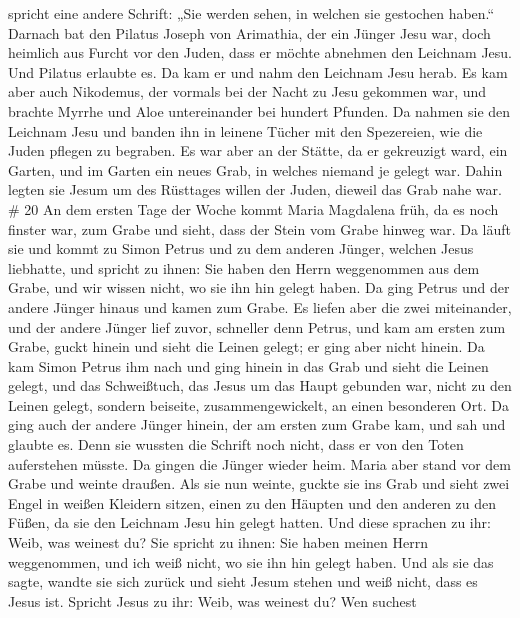 spricht eine andere Schrift: „Sie werden sehen, in welchen sie gestochen
haben.``  Darnach bat den Pilatus Joseph von Arimathia, der
ein Jünger Jesu war, doch heimlich aus Furcht vor den Juden, dass er
möchte abnehmen den Leichnam Jesu. Und Pilatus erlaubte es. Da kam er
und nahm den Leichnam Jesu herab.  Es kam aber auch
Nikodemus, der vormals bei der Nacht zu Jesu gekommen war, und brachte
Myrrhe und Aloe untereinander bei hundert Pfunden.  Da
nahmen sie den Leichnam Jesu und banden ihn in leinene Tücher mit den
Spezereien, wie die Juden pflegen zu begraben.  Es war aber
an der Stätte, da er gekreuzigt ward, ein Garten, und im Garten ein
neues Grab, in welches niemand je gelegt war.  Dahin legten
sie Jesum um des Rüsttages willen der Juden, dieweil das Grab nahe war.
\# 20  An dem ersten Tage der Woche kommt Maria Magdalena
früh, da es noch finster war, zum Grabe und sieht, dass der Stein vom
Grabe hinweg war.  Da läuft sie und kommt zu Simon Petrus
und zu dem anderen Jünger, welchen Jesus liebhatte, und spricht zu
ihnen: Sie haben den Herrn weggenommen aus dem Grabe, und wir wissen
nicht, wo sie ihn hin gelegt haben.  Da ging Petrus und der
andere Jünger hinaus und kamen zum Grabe.  Es liefen aber
die zwei miteinander, und der andere Jünger lief zuvor, schneller denn
Petrus, und kam am ersten zum Grabe,  guckt hinein und sieht
die Leinen gelegt; er ging aber nicht hinein.  Da kam Simon
Petrus ihm nach und ging hinein in das Grab und sieht die Leinen gelegt,
 und das Schweißtuch, das Jesus um das Haupt gebunden war,
nicht zu den Leinen gelegt, sondern beiseite, zusammengewickelt, an
einen besonderen Ort.  Da ging auch der andere Jünger
hinein, der am ersten zum Grabe kam, und sah und glaubte es.
 Denn sie wussten die Schrift noch nicht, dass er von den
Toten auferstehen müsste.  Da gingen die Jünger wieder
heim.  Maria aber stand vor dem Grabe und weinte draußen.
Als sie nun weinte, guckte sie ins Grab  und sieht zwei
Engel in weißen Kleidern sitzen, einen zu den Häupten und den anderen zu
den Füßen, da sie den Leichnam Jesu hin gelegt hatten.  Und
diese sprachen zu ihr: Weib, was weinest du? Sie spricht zu ihnen: Sie
haben meinen Herrn weggenommen, und ich weiß nicht, wo sie ihn hin
gelegt haben.  Und als sie das sagte, wandte sie sich
zurück und sieht Jesum stehen und weiß nicht, dass es Jesus ist.
 Spricht Jesus zu ihr: Weib, was weinest du? Wen suchest
